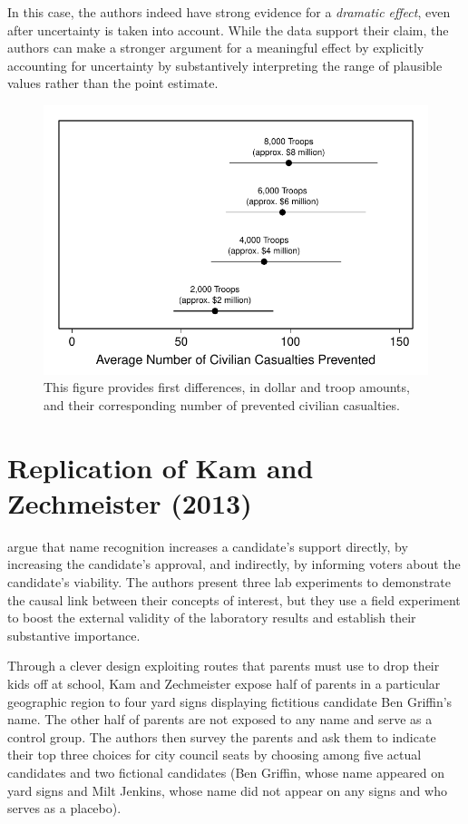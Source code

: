 \documentclass[12pt]{article}
\begin{document}
In this case, the authors indeed have strong evidence for a \emph{dramatic effect}, even after uncertainty is taken into account. While the data support their claim, the authors can make a stronger argument for a meaningful effect by explicitly accounting for uncertainty by substantively interpreting the range of plausible values rather than the point estimate.

\begin{figure}[H]
\begin{center}
\includegraphics[scale = .8]{figs/hks-ci.pdf}
\caption{This figure provides first differences, in dollar and troop amounts, and their corresponding number of prevented civilian casualties.}\label{fig:hks-ci}
\end{center}
\end{figure}

\section*{Replication of Kam and Zechmeister (2013)}

\cite{KamZechmeister2013} argue that name recognition increases a candidate's support directly, by increasing the candidate's approval, and indirectly, by informing voters about the candidate's viability. The authors present three lab experiments to demonstrate the causal link between their concepts of interest, but they use a field experiment to boost the external validity of the laboratory results and establish their substantive importance. 

Through a clever design exploiting routes that parents must use to drop their kids off at school, Kam and Zechmeister expose half of parents in a particular geographic region to four yard signs displaying fictitious candidate Ben Griffin's name. The other half of parents are not exposed to any name and serve as a control group. The authors then survey the parents and ask them to indicate their top three choices for city council seats by choosing among five actual candidates and two fictional candidates (Ben Griffin, whose name appeared on yard signs and Milt Jenkins, whose name did not appear on any signs and who serves as a placebo). 
\end{document}
